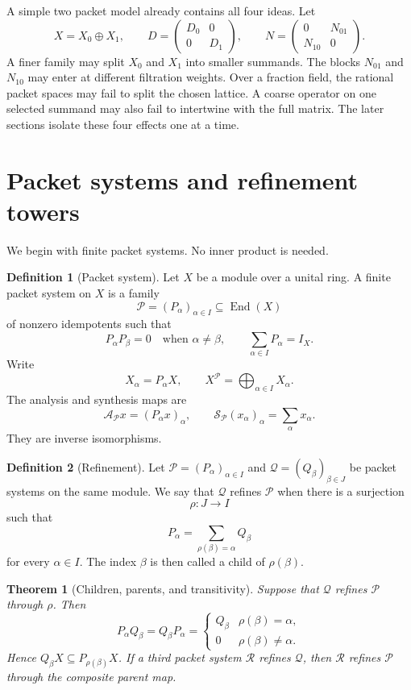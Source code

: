 \documentclass[11pt,a4paper]{article}
\newtheorem{theorem}{Theorem}[section]
\theoremstyle{definition}
\newtheorem{definition}[definition]{Definition}
\theoremstyle{remark}
\newcommand{\Acal}{\mathcal A}
\newcommand{\Pcal}{\mathcal P}
\newcommand{\Qcal}{\mathcal Q}
\newcommand{\Scal}{\mathcal S}
\newcommand{\Rcal}{\mathcal R}
\newcommand{\End}{\operatorname{End}}
\providecommand{\End}{\operatorname{End}}
\providecommand{\N}{\mathbb N}
\theoremstyle{definition}\newtheorem{construction}[theorem]{Construction}\newtheorem{certificate}[theorem]{Numerical Certificate}
\theoremstyle{remark}\newtheorem{boundary}[theorem]{Boundary}
\begin{document}
A simple two packet model already contains all four ideas.  Let
\[
X=X_0\oplus X_1,
\qquad
D=\begin{pmatrix}D_0&0\\0&D_1\end{pmatrix},
\qquad
N=\begin{pmatrix}0&N_{01}\\N_{10}&0\end{pmatrix}.
\]
A finer family may split $X_0$ and $X_1$ into smaller summands.  The blocks $N_{01}$ and $N_{10}$ may enter at different filtration weights.  Over a fraction field, the rational packet spaces may fail to split the chosen lattice.  A coarse operator on one selected summand may also fail to intertwine with the full matrix.  The later sections isolate these four effects one at a time.

\section{Packet systems and refinement towers}\label{sec:refinement}

We begin with finite packet systems.  No inner product is needed.

\begin{definition}[Packet system]\label{def:packet_system}
Let $X$ be a module over a unital ring.  A finite packet system on $X$ is a family
\[
\Pcal=(P_\alpha)_{\alpha\in I}
\subseteq\End(X)
\]
of nonzero idempotents such that
\[
P_\alpha P_\beta=0
\quad\text{when }\alpha\ne\beta,
\qquad
\sum_{\alpha\in I}P_\alpha=I_X.
\]
Write
\[
X_\alpha=P_\alpha X,
\qquad
X^{\Pcal}=\bigoplus_{\alpha\in I}X_\alpha.
\]
The analysis and synthesis maps are
\[
\Acal_{\Pcal}x=(P_\alpha x)_\alpha,
\qquad
\Scal_{\Pcal}(x_\alpha)_\alpha=\sum_\alpha x_\alpha.
\]
They are inverse isomorphisms.
\end{definition}

\begin{definition}[Refinement]\label{def:refinement}\label{def:refinement-map}
Let $\Pcal=(P_\alpha)_{\alpha\in I}$ and $\Qcal=(Q_\beta)_{\beta\in J}$ be packet systems on the same module.  We say that $\Qcal$ refines $\Pcal$ when there is a surjection
\[
\rho:J\longrightarrow I
\]
such that
\[
P_\alpha=\sum_{\rho(\beta)=\alpha}Q_\beta
\]
for every $\alpha\in I$.  The index $\beta$ is then called a child of $\rho(\beta)$.
\end{definition}

\begin{theorem}[Children, parents, and transitivity]\label{thm:children_transitivity}\label{thm:nested-refinement}
Suppose that $\Qcal$ refines $\Pcal$ through $\rho$.  Then
\[
P_\alpha Q_\beta
=
Q_\beta P_\alpha
=
\begin{cases}
Q_\beta & \rho(\beta)=\alpha,\\
0 & \rho(\beta)\ne\alpha.
\end{cases}
\]
Hence $Q_\beta X\subseteq P_{\rho(\beta)}X$.  If a third packet system $\Rcal$ refines $\Qcal$, then $\Rcal$ refines $\Pcal$ through the composite parent map.
\end{theorem}
\end{document}
